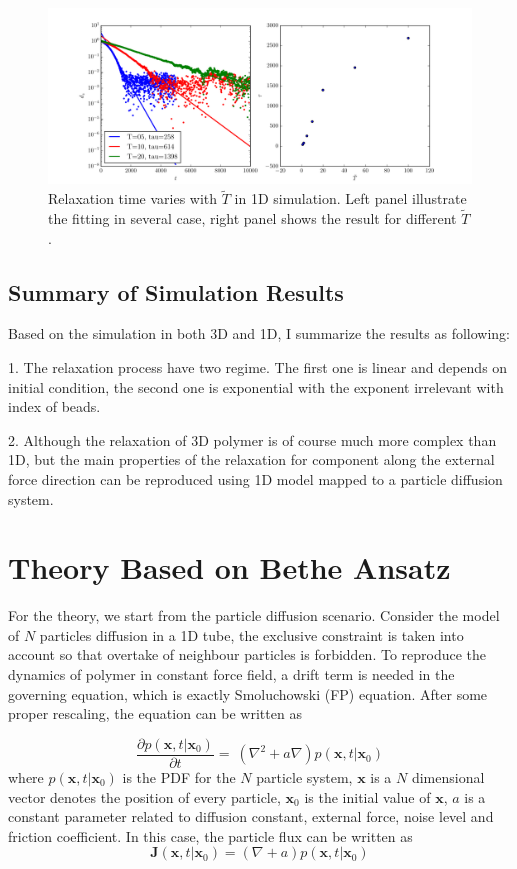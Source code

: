 \documentclass[12pt,a4paper]{article}
\begin{document}
\begin{figure}[htpb]
    \centering
    \includegraphics[width=1.0\linewidth]{fig4report/asepTempTau.pdf}
    \caption{Relaxation time varies with $\tilde{T}$ in 1D simulation. Left
        panel illustrate the fitting in several case, right panel shows the
        result for different $\tilde{T}$.} 
    \label{fig:aseptemptau}
\end{figure}

\subsection{Summary of Simulation Results}
Based on the simulation in both 3D and 1D, I summarize the results as following:

1. The relaxation process have two regime. The first one is linear and depends
on initial condition, the second one is exponential with the exponent irrelevant
with index of beads.

2. Although the relaxation of 3D polymer is of course much more complex than 1D,
but the main properties of the relaxation for component along the external force
direction can be reproduced using 1D model mapped to a particle diffusion system.

\section{Theory Based on Bethe Ansatz}
For the theory, we start from the particle diffusion scenario. Consider the
model of $N$ particles diffusion in a 1D tube, the exclusive constraint is taken
into account so that overtake of neighbour particles is forbidden. To reproduce
the dynamics of polymer in constant force field, a drift term is needed in the
governing equation, which is exactly Smoluchowski (FP) equation. After some
proper rescaling, the equation can be written as

\begin{equation}
    \label{eq:fp}
    \frac{\partial p(\mathbf{x},t|\mathbf{x}_0)}{\partial t} = \
    (\nabla^2 + a\nabla)p(\mathbf{x},t|\mathbf{x}_0)
\end{equation}
where $p(\mathbf{x},t|\mathbf{x}_0)$ is the PDF for the $N$
particle system, $\mathbf{x}$ is a $N$ dimensional vector denotes the position
of every particle, $\mathbf{x}_0$ is the initial value of $\mathbf{x}$, $a$ is a
constant parameter related to diffusion constant, external force, noise level
and friction coefficient.  
In this case, the particle flux can be written as 
\begin{equation}
    \mathbf{J}(\mathbf{x},t|\mathbf{x}_0) = (\nabla+a)p(\mathbf{x},t|\mathbf{x}_0)
\end{equation}
\end{document}

